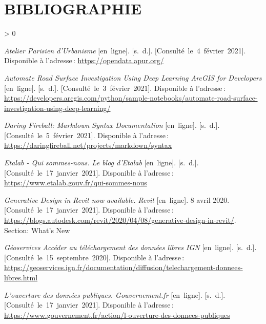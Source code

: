 \documentclass[
  11pt,
  french,
]{article}
\newlength{\cslhangindent}
\newenvironment{CSLReferences}[2] %
 {%
  \setlength{\parindent}{0pt}
  \ifodd #1 \everypar{\setlength{\hangindent}{\cslhangindent}}\ignorespaces\fi
  \ifnum #2 > 0
  \setlength{\parskip}{#2\baselineskip}
  \fi
 }%
 {}
\begin{document}
\newpage

\hypertarget{bibliographie}{%
\section*{BIBLIOGRAPHIE}\label{bibliographie}}

\hypertarget{refs}{}
\begin{CSLReferences}{0}{0}
\leavevmode\hypertarget{ref-opendataapur}{}%
\emph{Atelier Parisien d'Urbanisme} {[}en~ligne{]}. {[}s.~d.{]}.
{[}Consulté~le~4~février~2021{]}. Disponible à l'adresse\,:
\url{https://opendata.apur.org/}

\leavevmode\hypertarget{ref-arcgis2}{}%
\emph{Automate Road Surface Investigation Using Deep Learning \textbar{}
ArcGIS for Developers} {[}en~ligne{]}. {[}s.~d.{]}.
{[}Consulté~le~3~février~2021{]}. Disponible à l'adresse\,:
\url{https://developers.arcgis.com/python/sample-notebooks/automate-road-surface-investigation-using-deep-learning/}

\leavevmode\hypertarget{ref-mdsynt}{}%
\emph{Daring Fireball: Markdown Syntax Documentation} {[}en~ligne{]}.
{[}s.~d.{]}. {[}Consulté~le~5~février~2021{]}. Disponible à l'adresse\,:
\url{https://daringfireball.net/projects/markdown/syntax}

\leavevmode\hypertarget{ref-etalab}{}%
\emph{Etalab - Qui sommes-nous. Le blog d'Etalab} {[}en~ligne{]}.
{[}s.~d.{]}. {[}Consulté~le~17~janvier~2021{]}. Disponible à
l'adresse\,: \url{https://www.etalab.gouv.fr/qui-sommes-nous}

\leavevmode\hypertarget{ref-gdrevit}{}%
\emph{Generative Design in Revit now available. Revit} {[}en~ligne{]}. 8
avril 2020. {[}Consulté~le~17~janvier~2021{]}. Disponible à l'adresse\,:
\url{https://blogs.autodesk.com/revit/2020/04/08/generative-design-in-revit/}.
Section: What's New

\leavevmode\hypertarget{ref-ign}{}%
\emph{Géoservices \textbar{} Accéder au téléchargement des données
libres IGN} {[}en~ligne{]}. {[}s.~d.{]}.
{[}Consulté~le~15~septembre~2020{]}. Disponible à l'adresse\,:
\url{https://geoservices.ign.fr/documentation/diffusion/telechargement-donnees-libres.html}

\leavevmode\hypertarget{ref-ouvdonpub}{}%
\emph{L'ouverture des données publiques. Gouvernement.fr}
{[}en~ligne{]}. {[}s.~d.{]}. {[}Consulté~le~17~janvier~2021{]}.
Disponible à l'adresse\,:
\url{https://www.gouvernement.fr/action/l-ouverture-des-donnees-publiques}


\end{CSLReferences}
\end{document}
